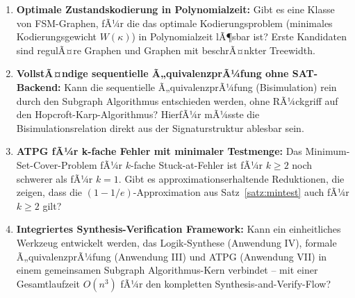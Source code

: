 ﻿\documentclass[a4paper,12pt]{article}
\theoremstyle{definition}
\begin{document}
\begin{enumerate}
  \item \textbf{Optimale Zustandskodierung in Polynomialzeit:} Gibt es eine Klasse
        von FSM-Graphen, fÃ¼r die das optimale Kodierungsproblem (minimales
        Kodierungsgewicht $W(\kappa)$) in Polynomialzeit lÃ¶sbar ist? Erste Kandidaten
        sind regulÃ¤re Graphen und Graphen mit beschrÃ¤nkter Treewidth.

  \item \textbf{VollstÃ¤ndige sequentielle Ã„quivalenzprÃ¼fung ohne SAT-Backend:}
        Kann die sequentielle Ã„quivalenzprÃ¼fung (Bisimulation) rein durch den Subgraph
        Algorithmus entschieden werden, ohne RÃ¼ckgriff auf den Hopcroft-Karp-Algorithmus?
        HierfÃ¼r mÃ¼sste die Bisimulationsrelation direkt aus der Signaturstruktur
        ablesbar sein.

  \item \textbf{ATPG fÃ¼r k-fache Fehler mit minimaler Testmenge:} Das Minimum-Set-Cover-Problem
        fÃ¼r $k$-fache Stuck-at-Fehler ist fÃ¼r $k \geq 2$ noch schwerer als fÃ¼r
        $k = 1$. Gibt es approximationserhaltende Reduktionen, die zeigen, dass die
        $(1-1/e)$-Approximation aus Satz~\ref{satz:mintest} auch fÃ¼r $k \geq 2$ gilt?

  \item \textbf{Integriertes Synthesis-Verification Framework:} Kann ein einheitliches
        Werkzeug entwickelt werden, das Logik-Synthese (Anwendung IV), formale
        Ã„quivalenz\-prÃ¼fung (Anwendung III) und ATPG (Anwendung VII) in einem
        gemeinsamen Subgraph Algorithmus-Kern verbindet -- mit einer Gesamtlaufzeit
        $O(n^3)$ fÃ¼r den kompletten Synthesis-and-Verify-Flow?
\end{enumerate}
\end{document}
